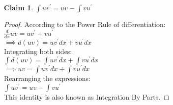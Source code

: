\documentclass{article}
\newtheorem{claim}{Claim}
\begin{document}
\begin{claim}
    $ \int{uv^{\prime}} = uv - \int{vu^{\prime}} $
\end{claim}

\begin{proof}
    According to the Power Rule of differentiation:\\

    $ \frac{d}{dx}uv = uv^{\prime} + vu^{\prime} $\\

    $ \implies d(uv) = uv^{\prime}dx + vu^{\prime}dx $\\

    Integrating both sides:\\

    $ \int{d(uv)} = \int{uv^{\prime}dx} + \int{vu^{\prime}dx} $\\

    $ \implies uv = \int{uv^{\prime}dx} + \int{vu^{\prime}dx} $\\

    Rearranging the expressions:\\

    $ \int{uv^{\prime}} = uv - \int{vu^{\prime}} $\\

    This identity is also known as Integration By Parts.
\end{proof}
\end{document}
